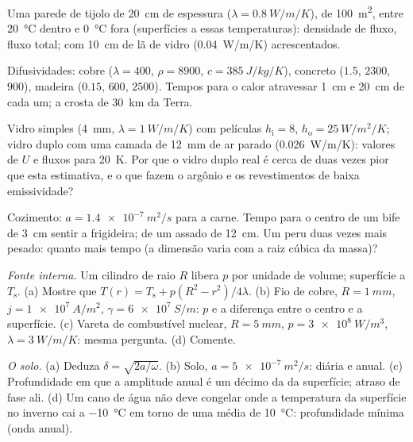 \begin{exercise}[$\star$]\label{exo:b2:heat-conduction:1}
Uma parede de tijolo de \qty{20}{cm} de espessura ($\lambda = \qty{0.8}{W/m/K}$), de \qty{100}{m^2},
entre \qty{20}{\celsius} dentro e \qty{0}{\celsius} fora
(superfícies a essas temperaturas): densidade de fluxo, fluxo total; com
\qty{10}{cm} de lã de vidro (\qty{0.04}{W/m/K}) acrescentados.
\end{exercise}

\begin{exercise}[$\star$]\label{exo:b2:heat-conduction:2}
Difusividades: cobre ($\lambda = 400$, $\rho = 8900$, $c = \qty{385}{J/kg/K}$),
concreto ($1.5$, $2300$, $900$), madeira ($0.15$, $600$, $2500$). Tempos para o calor
atravessar \qty{1}{cm} e \qty{20}{cm} de cada um; a crosta de \qty{30}{km} da
Terra.
\end{exercise}

\begin{exercise}[$\star$]\label{exo:b2:heat-conduction:3}
Vidro simples (\qty{4}{mm}, $\lambda = \qty{1}{W/m/K}$) com películas $h_{\text{i}}
= 8$, $h_{\text{o}} = \qty{25}{W/m^2/K}$; vidro duplo com uma camada de \qty{12}{mm}
de ar parado (\qty{0.026}{W/m/K}): valores de $U$ e fluxos para
\qty{20}{K}. Por que o vidro duplo real é cerca de duas vezes pior que esta
estimativa, e o que fazem o argônio e os revestimentos de baixa emissividade?
\end{exercise}

\begin{exercise}[$\star$]\label{exo:b2:heat-conduction:4}
Cozimento: $a = \qty{1.4e-7}{m^2/s}$ para a carne. Tempo para o centro de um
bife de \qty{3}{cm} sentir a frigideira; de um assado de \qty{12}{cm}. Um peru
duas vezes mais pesado: quanto mais tempo (a dimensão varia com a raiz cúbica
da massa)?
\end{exercise}

\begin{exercise}[$\star\star$]\label{exo:b2:heat-conduction:5}
\emph{Fonte interna.} Um cilindro de raio $R$ libera $p$ por unidade de
volume; superfície a $T_{\text{s}}$. (a) Mostre que $T(r) = T_{\text{s}} +
p(R^2 - r^2)/4\lambda$. (b) Fio de cobre, $R = \qty{1}{mm}$, $j =
\qty{1e7}{A/m^2}$, $\gamma = \qty{6e7}{S/m}$: $p$ e a diferença entre o centro e a
superfície. (c) Vareta de combustível nuclear, $R = \qty{5}{mm}$, $p = \qty{3e8}{W/m^3}$,
$\lambda = \qty{3}{W/m/K}$: mesma pergunta. (d) Comente.
\end{exercise}

\begin{exercise}[$\star\star$]\label{exo:b2:heat-conduction:6}
\emph{O solo.} (a) Deduza $\delta = \sqrt{2a/\omega}$. (b) Solo,
$a = \qty{5e-7}{m^2/s}$:  diária e anual. (c) Profundidade
em que a amplitude anual é um décimo da da superfície; atraso de fase
ali. (d) Um cano de água não deve congelar onde a temperatura da superfície
no inverno cai a \qty{-10}{\celsius} em torno de uma média de
\qty{10}{\celsius}: profundidade mínima (onda anual).
\end{exercise}


